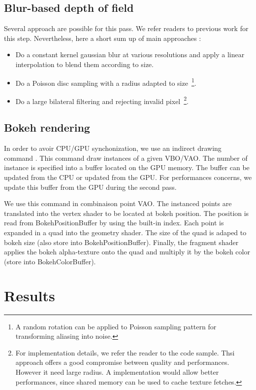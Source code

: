 \subsection{Blur-based depth of field}
Several approach are possible for this pass. We refer readers to previous work for this step. Nevertheless, here a short sum up of main approaches :
\begin{itemize}
	\item Do a constant kernel gaussian blur at various resolutions and apply a linear interpolation to blend them according to \coc size.
	\item Do a Poisson disc sampling with a radius adapted to \coc size~\footnote{A random rotation can be applied to Poisson sampling pattern for transforming aliasing into noise.}.
	\item Do a large bilateral filtering and rejecting invalid pixel~\footnote{For implementation details, we refer the reader to the code sample. Thsi approach offers a good compromise between quality and performances. However it need large radius. A \opencl implementation would allow better performances, since shared memory can be used to cache texture fetches.}.
\end{itemize}


\subsection{Bokeh rendering}
In order to avoir CPU/GPU synchonization, we use an indirect drawing command . This command draw instances of a given VBO/VAO. The number of instance is specified into a buffer located on the GPU memory. The buffer can be updated from the CPU or updated from the GPU. For performances concerns, we update this buffer from the GPU during the second pass. 

We use this command in combinaison point VAO. The instanced points are translated into the vertex shader to be located at bokeh position. The position is read from BokehPositionBuffer by using the built-in  index. Each point is expanded in a quad into the geometry shader. The size of the quad is adaped to bokeh size (also store into BokehPositionBuffer). Finally, the fragment shader applies the bokeh alpha-texture onto the quad and multiply it by the bokeh color (store into BokehColorBuffer).

\section{Results}

